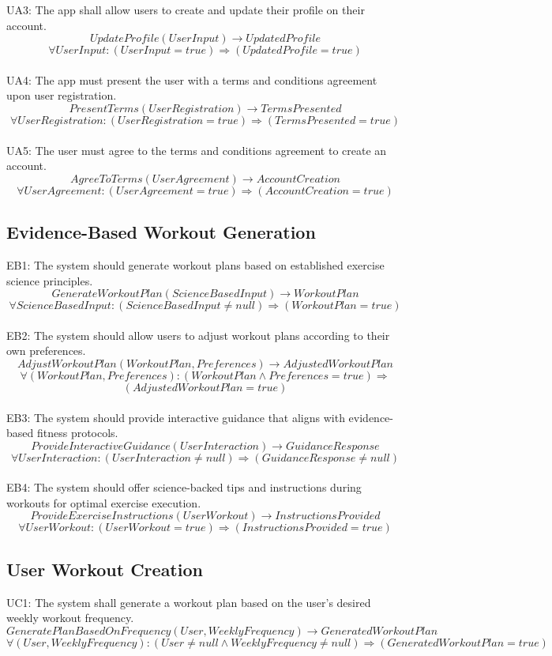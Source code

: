 \documentclass[12pt]{article}
\begin{document}
UA3: The app shall allow users to create and update their profile on their account.
\[UpdateProfile(UserInput) \rightarrow UpdatedProfile \]
\[ \forall UserInput: (UserInput = true) \Rightarrow (UpdatedProfile = true) \]\\

UA4: The app must present the user with a terms and conditions agreement upon user registration.
\[PresentTerms(UserRegistration) \rightarrow TermsPresented \]
\[ \forall UserRegistration: (UserRegistration = true) \Rightarrow (TermsPresented = true) \]\\

UA5: The user must agree to the terms and conditions agreement to create an account.
\[AgreeToTerms(UserAgreement) \rightarrow AccountCreation \]
\[ \forall UserAgreement: (UserAgreement = true) \Rightarrow (AccountCreation = true) \]

\subsection{Evidence-Based Workout Generation}

\parindent EB1: The system should generate workout plans based on established exercise science principles.
\[GenerateWorkoutPlan(ScienceBasedInput) \rightarrow WorkoutPlan \]
\[ \forall ScienceBasedInput: (ScienceBasedInput \neq null) \Rightarrow (WorkoutPlan = true) \]\\

EB2: The system should allow users to adjust workout plans according to their own preferences.
\[AdjustWorkoutPlan(WorkoutPlan, Preferences) \rightarrow AdjustedWorkoutPlan \]
\[ \forall (WorkoutPlan, Preferences): (WorkoutPlan \land Preferences = true) \Rightarrow\] \[(AdjustedWorkoutPlan = true) \]\\

EB3: The system should provide interactive guidance that aligns with evidence-based fitness protocols.
\[ProvideInteractiveGuidance(UserInteraction) \rightarrow GuidanceResponse \]
\[ \forall UserInteraction: (UserInteraction \neq null) \Rightarrow (GuidanceResponse \neq null) \]\\

EB4: The system should offer science-backed tips and instructions during workouts for optimal exercise execution.
\[ProvideExerciseInstructions(UserWorkout) \rightarrow InstructionsProvided \]
\[ \forall UserWorkout: (UserWorkout = true) \Rightarrow (InstructionsProvided = true) \]

\subsection{User Workout Creation}
UC1: The system shall generate a workout plan based on the user's desired weekly workout frequency.
\[GeneratePlanBasedOnFrequency(User, WeeklyFrequency) \rightarrow GeneratedWorkoutPlan \]
\[ \forall (User, WeeklyFrequency): (User \neq null \land WeeklyFrequency \neq null) \Rightarrow (GeneratedWorkoutPlan = true) \]
\\
\end{document}
